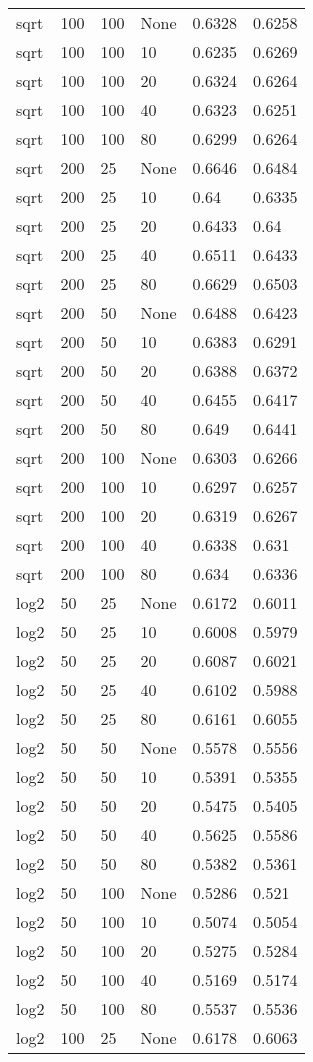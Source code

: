 \documentclass{article}%
\begin{document}
\begin{longtable}{l l l l l l}
sqrt&100&100&None&0.6328&0.6258\\%
sqrt&100&100&10&0.6235&0.6269\\%
sqrt&100&100&20&0.6324&0.6264\\%
sqrt&100&100&40&0.6323&0.6251\\%
sqrt&100&100&80&0.6299&0.6264\\%
sqrt&200&25&None&0.6646&0.6484\\%
sqrt&200&25&10&0.64&0.6335\\%
sqrt&200&25&20&0.6433&0.64\\%
sqrt&200&25&40&0.6511&0.6433\\%
sqrt&200&25&80&0.6629&0.6503\\%
sqrt&200&50&None&0.6488&0.6423\\%
sqrt&200&50&10&0.6383&0.6291\\%
sqrt&200&50&20&0.6388&0.6372\\%
sqrt&200&50&40&0.6455&0.6417\\%
sqrt&200&50&80&0.649&0.6441\\%
sqrt&200&100&None&0.6303&0.6266\\%
sqrt&200&100&10&0.6297&0.6257\\%
sqrt&200&100&20&0.6319&0.6267\\%
sqrt&200&100&40&0.6338&0.631\\%
sqrt&200&100&80&0.634&0.6336\\%
log2&50&25&None&0.6172&0.6011\\%
log2&50&25&10&0.6008&0.5979\\%
log2&50&25&20&0.6087&0.6021\\%
log2&50&25&40&0.6102&0.5988\\%
log2&50&25&80&0.6161&0.6055\\%
log2&50&50&None&0.5578&0.5556\\%
log2&50&50&10&0.5391&0.5355\\%
log2&50&50&20&0.5475&0.5405\\%
log2&50&50&40&0.5625&0.5586\\%
log2&50&50&80&0.5382&0.5361\\%
log2&50&100&None&0.5286&0.521\\%
log2&50&100&10&0.5074&0.5054\\%
log2&50&100&20&0.5275&0.5284\\%
log2&50&100&40&0.5169&0.5174\\%
log2&50&100&80&0.5537&0.5536\\%
log2&100&25&None&0.6178&0.6063\\%

\end{longtable}
\end{document}
